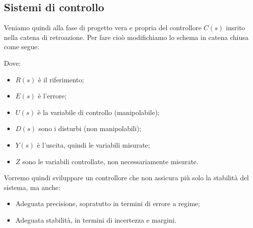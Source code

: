 \documentclass[a4paper,11pt]{article}
\begin{document}
\subsection{Sistemi di controllo}
Veniamo quindi alla fase di progetto vera e propria del controllore $C(s)$ insrito nella catena di retroazione.
Per fare cioò modifichiamo lo schema in catena chiusa come segue:
\begin{center}
\end{center}

Dove:
\begin{itemize}
	\item $R(s)$ è il riferimento;
	\item $E(s)$ è l'errore;
	\item $U(s)$ è la variabile di controllo (manipolabile);
	\item $D(s)$ sono i disturbi (non manipolabili);
	\item $Y(s)$ è l'uscita, quindi le variabili misurate;
	\item $Z$ sono le variabili controllate, non necessariamente misurate.
\end{itemize}

Vorremo quindi sviluppare un controllore che non assicura più solo la stabilità del sistema, ma anche:
\begin{itemize}
	\item Adeguata precisione, sopratutto in termini di errore a regime;
	\item Adeguata stabilità, in termini di incertezza e margini.
\end{itemize}
\end{document}
